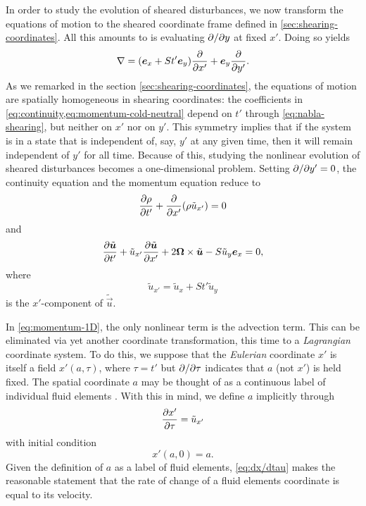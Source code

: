 \documentclass[aps,pre,notitlepage,amsmath,amssymb,amsfonts,nobibnotes,nofootinbib,superscriptaddress,onecolumn,a4paper,10pt]{revtex4-1}
\newcommand{\tvec}[1]{\tilde{\vec{#1}}}
\begin{document}
In order to study the evolution of sheared disturbances, we now transform the
equations of motion  to the
sheared coordinate frame defined in \cref{sec:shearing-coordinates}. All this
amounts to is evaluating $\partial{}/\partial{y}$ at fixed $x'$. Doing so yields
\begin{equation}
  \label{eq:nabla-shearing}
  \nabla = (\bm{e}_x + St'\bm{e}_y)\frac{\partial}{\partial x'} + \bm{e}_y\frac{\partial}{\partial y'}.
\end{equation}
As we remarked in the section \cref{sec:shearing-coordinates}, the equations
of motion are spatially homogeneous in shearing coordinates: the coefficients
in \cref{eq:continuity,eq:momentum-cold-neutral} depend on $t'$ through
\cref{eq:nabla-shearing}, but neither on $x'$ nor on $y'$. This symmetry
implies that if the system is in a state that is independent of, say, $y'$ at
any given time, then it will remain independent of $y'$ for all time. Because
of this, studying the nonlinear evolution of sheared disturbances becomes a
one-dimensional problem. Setting $\partial{}/\partial{y'}=0$, the continuity equation
 and the momentum equation
 reduce to
\begin{equation}
  \label{eq:continuity-1D}
  \frac{\partial\rho}{\partial t'} + \frac{\partial}{\partial x'}(\rho\tilde{u}_{x'}) = 0
\end{equation}
and
\begin{equation}
  \label{eq:momentum-1D}
  \pder{\tvec{u}}{t'} + \tilde{u}_{x'}\pder{\tvec{u}}{x'}
  + 2\vec{\Omega}\times\tvec{u} - S\tilde{u}_y\ex = 0,
\end{equation}
where
\begin{equation}
  \label{eq:ux-prime}
  \tilde{u}_{x'} = \tilde{u}_x + St'\tilde{u}_y
\end{equation}
is the $x'$-component of $\tvec{u}$.

In \cref{eq:momentum-1D}, the only nonlinear term is the advection term. This
can be eliminated via yet another coordinate transformation, this time to a
\emph{Lagrangian} coordinate system. To do this, we suppose that the
\emph{Eulerian} coordinate $x'$ is itself a field $x'(a,\tau)$, where
$\tau=t'$ but $\partial{}/\partial{\tau}$ indicates that $a$ (not $x'$) is held fixed.
The spatial coordinate $a$ may be thought of as a continuous label of
individual fluid elements \citep[see the beautiful review of Hamiltonian fluid
mechanics by][]{Salmon1988}. With this in mind, we define $a$ implicitly
through
\begin{equation}
  \label{eq:dx/dtau}
  \frac{\partial x'}{\partial\tau} = \tilde{u}_{x'}
\end{equation}
with initial condition
\begin{equation}
  \label{eq:initial-x}
  x'(a,0) = a.
\end{equation}
Given the definition of $a$ as a label of fluid elements, \cref{eq:dx/dtau}
makes the reasonable statement that the rate of change of a fluid elements
coordinate is equal to its velocity.
\end{document}

